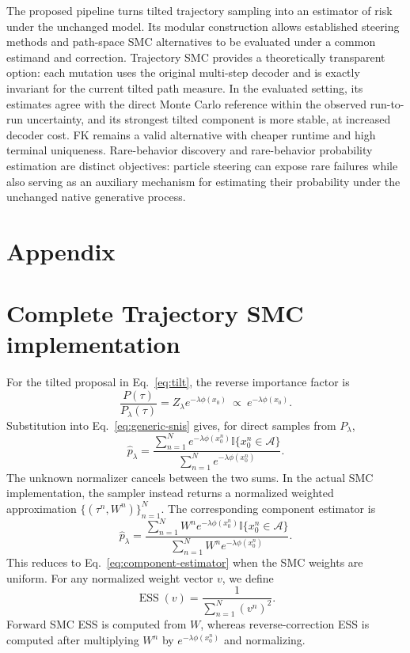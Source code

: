 \documentclass{article}
\newcommand{\ind}{\mathbb{I}}
\newcommand{\ESS}{\operatorname{ESS}}
\newcounter{algorithm}
\begin{document}
The proposed pipeline turns tilted trajectory sampling
into an estimator of risk under the unchanged model. Its modular construction
allows established steering methods and path-space SMC alternatives to be
evaluated under a common estimand and correction. Trajectory SMC provides a
theoretically transparent option: each
mutation uses the original multi-step decoder and is exactly invariant for the
current tilted path measure. In the evaluated setting, its estimates agree
with the direct Monte Carlo reference within the observed run-to-run
uncertainty, and its strongest tilted component is more stable, at increased
decoder cost. FK remains a valid alternative with cheaper runtime and high
terminal uniqueness. Rare-behavior discovery and rare-behavior probability
estimation are distinct objectives: particle steering can expose rare failures
while also serving as an auxiliary mechanism for estimating their probability
under the unchanged native generative process.




\appendix
\section*{Appendix}

\section{Complete Trajectory SMC implementation}
\label{app:complete-algorithm}

For the tilted proposal in Eq.~\eqref{eq:tilt}, the reverse importance factor
is
\begin{equation}
\frac{P(\tau)}{P_\lambda(\tau)}
=Z_\lambda e^{-\lambda\phi(x_0)}
\ \propto\ e^{-\lambda\phi(x_0)}.
\label{eq:reverse-factor}
\end{equation}
Substitution into Eq.~\eqref{eq:generic-snis} gives, for direct samples from
$P_\lambda$,
\begin{equation}
\widehat p_\lambda=
\frac{\sum_{n=1}^{N}e^{-\lambda\phi(x^n_0)}
\ind\{x^n_0\in\mathcal A\}}
{\sum_{n=1}^{N}e^{-\lambda\phi(x^n_0)}}.
\label{eq:component-estimator}
\end{equation}
The unknown normalizer cancels between the two sums. In the actual SMC
implementation, the sampler instead returns a normalized weighted
approximation $\{(\tau^n,W^n)\}_{n=1}^{N}$. The corresponding component
estimator is
\begin{equation}
\widehat p_\lambda=
\frac{\sum_{n=1}^{N}W^n e^{-\lambda\phi(x^n_0)}
\ind\{x^n_0\in\mathcal A\}}
{\sum_{n=1}^{N}W^n e^{-\lambda\phi(x^n_0)}}.
\label{eq:weighted-component-estimator}
\end{equation}
This reduces to Eq.~\eqref{eq:component-estimator} when the SMC weights are
uniform. For any normalized weight vector $v$, we define
\begin{equation}
\ESS(v)=\frac{1}{\sum_{n=1}^{N}(v^n)^2}.
\label{eq:ess-definition}
\end{equation}
Forward SMC ESS is computed from $W$, whereas reverse-correction ESS is
computed after multiplying $W^n$ by $e^{-\lambda\phi(x^n_0)}$ and normalizing.
\end{document}

